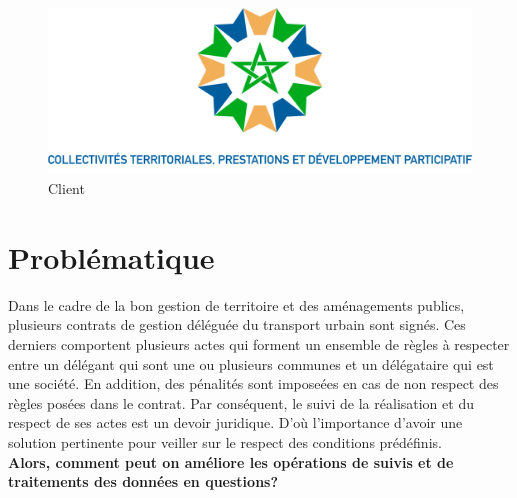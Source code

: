 \documentclass[a4paper]{report}
\begin{document}
\begin{doublespace}
    \begin{figure}[H]
        \begin{center}
            \includegraphics[scale=0.27]{images/logo-fr.png}
            \caption{Client}
        \end{center}
    \end{figure}
    \newpage
    \section{Problématique}
    Dans le cadre de la bon gestion de territoire et des aménagements publics, plusieurs
    contrats de gestion déléguée du transport urbain sont signés. Ces derniers comportent
    plusieurs actes qui forment un ensemble de règles à respecter entre un délégant qui
    sont une ou plusieurs communes et un délégataire qui est une société. En addition,
    des pénalités sont imposeées en cas de non respect des règles posées dans le contrat.
    Par conséquent, le suivi de la réalisation et du respect de ses actes est un devoir
    juridique. D’où l'importance d'avoir une solution pertinente pour veiller sur le
    respect des conditions prédéfinis.
    \\\textbf{Alors, comment peut on améliore les opérations de suivis et de traitements des données en questions?}

\end{doublespace}
\end{document}
